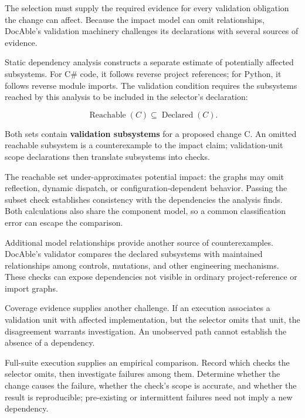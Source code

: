The selection must supply the required evidence for every validation obligation the change can affect. Because the impact model can omit relationships, DocAble's validation machinery challenges its declarations with several sources of evidence.

Static dependency analysis constructs a separate estimate of potentially affected subsystems. For C\# code, it follows reverse project references; for Python, it follows reverse module imports. The validation condition requires the subsystems reached by this analysis to be included in the selector's declaration:

\[
\operatorname{Reachable}(C) \subseteq \operatorname{Declared}(C).
\]

Both sets contain \textbf{validation subsystems} for a proposed change C. An omitted reachable subsystem is a counterexample to the impact claim; validation-unit scope declarations then translate subsystems into checks.

The reachable set under-approximates potential impact: the graphs may omit reflection, dynamic dispatch, or configuration-dependent behavior. Passing the subset check establishes consistency with the dependencies the analysis finds. Both calculations also share the component model, so a common classification error can escape the comparison.

Additional model relationships provide another source of counterexamples. DocAble's validator compares the declared subsystems with maintained relationships among controls, mutations, and other engineering mechanisms. These checks can expose dependencies not visible in ordinary project-reference or import graphs.

Coverage evidence supplies another challenge. If an execution associates a validation unit with affected implementation, but the selector omits that unit, the disagreement warrants investigation. An unobserved path cannot establish the absence of a dependency.

Full-suite execution supplies an empirical comparison. Record which checks the selector omits, then investigate failures among them. Determine whether the change causes the failure, whether the check's scope is accurate, and whether the result is reproducible; pre-existing or intermittent failures need not imply a new dependency.

